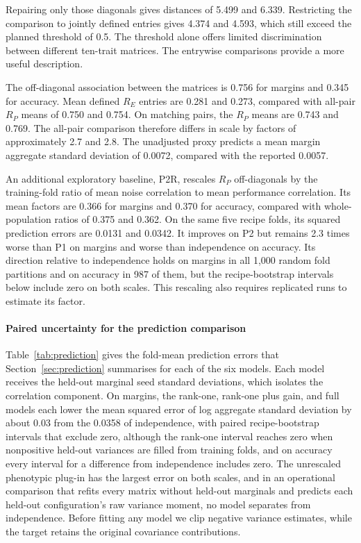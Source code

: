 Repairing only those diagonals gives distances of 5.499 and 6.339. Restricting the comparison to jointly defined entries gives 4.374 and 4.593, which still exceed the planned threshold of 0.5. The threshold alone offers limited discrimination between different ten-trait matrices. The entrywise comparisons provide a more useful description.

The off-diagonal association between the matrices is 0.756 for margins and 0.345 for accuracy. Mean defined $R_E$ entries are 0.281 and 0.273, compared with all-pair $R_P$ means of 0.750 and 0.754. On matching pairs, the $R_P$ means are 0.743 and 0.769. The all-pair comparison therefore differs in scale by factors of approximately 2.7 and 2.8. The unadjusted proxy predicts a mean margin aggregate standard deviation of 0.0072, compared with the reported 0.0057.

An additional exploratory baseline, P2R, rescales $R_P$ off-diagonals by the training-fold ratio of mean noise correlation to mean performance correlation. Its mean factors are 0.366 for margins and 0.370 for accuracy, compared with whole-population ratios of 0.375 and 0.362. On the same five recipe folds, its squared prediction errors are 0.0131 and 0.0342. It improves on P2 but remains 2.3 times worse than P1 on margins and worse than independence on accuracy. Its direction relative to independence holds on margins in all 1,000 random fold partitions and on accuracy in 987 of them, but the recipe-bootstrap intervals below include zero on both scales. This rescaling also requires replicated runs to estimate its factor.

\paragraph{Paired uncertainty for the prediction comparison}\label{app:paired}
Table~\ref{tab:prediction} gives the fold-mean prediction errors that Section~\ref{sec:prediction} summarises for each of the six models. Each model receives the held-out marginal seed standard deviations, which isolates the correlation component. On margins, the rank-one, rank-one plus gain, and full models each lower the mean squared error of log aggregate standard deviation by about 0.03 from the 0.0358 of independence, with paired recipe-bootstrap intervals that exclude zero, although the rank-one interval reaches zero when nonpositive held-out variances are filled from training folds, and on accuracy every interval for a difference from independence includes zero. The unrescaled phenotypic plug-in has the largest error on both scales, and in an operational comparison that refits every matrix without held-out marginals and predicts each held-out configuration's raw variance moment, no model separates from independence. Before fitting any model we clip negative variance estimates, while the target retains the original covariance contributions.

